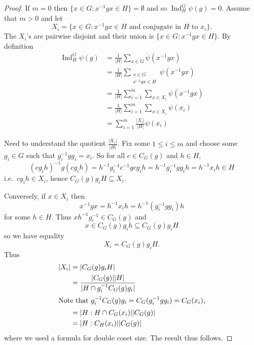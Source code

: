 \documentclass[a4paper]{article}
\DeclareMathOperator{\Ind}{Ind} %
\theoremstyle{definition}
\begin{document}
\begin{proof}
  If \(m = 0\) then \(\{x \in G: x^{-1} g x \in H\} = \emptyset\)  and so \(\Ind_H^G \psi(g) = 0\). Assume that \(m > 0\) and let
  \[
    X_i = \{x \in G: x^{-1} g x \in H \text{ and conjugate in \(H\) to \(x_i\)}\}.
  \]
  The \(X_i\)'s are pairwise disjoint and their union is \(\{x \in G: x^{-1} g x \in H\}\). By definition
  \begin{align*}
    \Ind_H^G \psi(g)
    &= \frac{1}{|H|} \sum_{x \in G} \ocirc \psi(x^{-1} g x) \\
    &= \frac{1}{|H|} \sum_{\substack{x \in G \\ x^{-1} g x \in H}} \psi(x^{-1} gx) \\
    &= \frac{1}{|H|} \sum_{i = 1}^m \sum_{x \in X_i} \psi(x^{-1} g x) \\
    &= \frac{1}{|H|} \sum_{i = 1}^m \sum_{x \in X_i} \psi(x_i) \\
    &= \sum_{i = 1}^m \frac{|X_i|}{|H|} \psi(x_i)
  \end{align*}

  Need to understand the quotient \(\frac{|X_i|}{|H|}\). Fix some \(1 \leq i \leq m\) and choose some \(g_i \in G\) such that \(g_i^{-1} g g_i = x_i\). So for all \(c \in C_G(g)\) and \(h \in H\),
  \[
    (cg_ih)^{-1} g (cg_ih)
    = h^{-1} g_i^{-1} c^{-1} g c g_i h
    = h^{-1} g_i^{-1} g g_i h
    = h^{-1} x_i h
    \in H
  \]
  i.e.\ \(cg_ih \in X_i\), hence \(C_G(g) g_i H \subseteq X_i\).

  Conversely, if \(x \in X_i\) then
  \[
    x^{-1} g x
    = h^{-1} x_i h 
    = h^{-1} (g_i^{-1} g g_i) h
  \]
  for some \(h \in H\). Thus \(x h^{-1} g_i^{-1} \in C_G(g)\) and
  \[
    x \in C_G(g) g_i h \subseteq C_G(g) g_i H
  \]
  so we have equality
  \[
    X_i = C_G(g) g_i H.
  \]
  Thus
  \begin{align*}
    |X_i|
    &= |C_G(g) g_i H| \\
    &= \frac{|C_G(g)| |H|}{|H \cap g_i^{-1} C_G(g) g_i|} \\
    \intertext{Note that \(g_i^{-1} C_G(g) g_i = C_G(g_i^{-1} g g_i) = C_G(x_i)\),}
    &= |H: H \cap C_G(x_i)| |C_G(g)| \\
    &= |H: C_H(x_i)| |C_G(g)|
  \end{align*}
  where we used a formula for double coset size. The result thus follows.
\end{proof}
\end{document}
